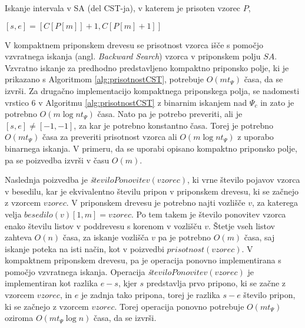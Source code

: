 \begin{algorithm}[htb]

\caption{Iskanje intervala v SA (del CST-ja), v katerem je prisoten vzorec $P$,  \cite{Navarro2016}}\label{alg:prisotnostCST}
{
    {$[s,e]=[C[P[m]]+1,C[P[m]+1]]$}
    

    {\KwRet{$[s,e]$}}
}

\end{algorithm}

V kompaktnem priponskem drevesu se prisotnost vzorca išče s pomočjo vzvratnega iskanja (angl. \textit{Backward Search}) vzorca v priponskem polju $SA$. Vzvratno iskanje za predhodno predstavljeno kompaktno priponsko polje, ki je prikazano s Algoritmom \ref{alg:prisotnostCST}, potrebuje $O(mt_\Psi)$ časa, da se izvrši. Za drugačno implementacijo kompaktnega priponskega polja, se nadomesti vrstico 6 v Algoritmu \ref{alg:prisotnostCST} z binarnim iskanjem nad $\Psi_c$ in zato je potrebno $O(m\log{n}t_\Psi)$ časa. Nato pa je potrebo preveriti, ali je $[s,e]\ne[-1,-1]$, za kar je potrebno konstantno časa. Torej je potrebno $O(mt_\Psi)$ časa za preveriti prisotnost vzorca ali $O(m\log{n}t_\Psi)$ z uporabo binarnega iskanja. V primeru, da se uporabi opisano kompaktno priponsko polje, pa se poizvedba izvrši v času $O(m)$.

Naslednja poizvedba je \textit{š}$teviloPonovitev(vzorec)$, ki vrne  število pojavov vzorca v besedilu, kar je ekvivalentno številu pripon v priponskem drevesu, ki se začnejo z vzorcem $vzorec$. V priponskem drevesu je potrebno najti vozlišče $v$, za katerega velja $besedilo(v)[1,m]=vzorec$. Po tem takem je število ponovitev vzorca enako številu listov v poddrevesu s korenom v vozlišču $v$. Štetje vseh listov zahteva $O(n)$ časa, za iskanje vozlišča $v$ pa je potrebno $O(m)$ časa, saj iskanje poteka na isti način, kot v poizvedbi  $prisotnost(vzorec)$. V kompaktnem priponskem drevesu, pa je operacija ponovno implementirana s pomočjo vzvratnega iskanja. Operacija \textit{š}$teviloPonovitev(vzorec)$ je implementiran kot razlika $e-s$, kjer $s$ predstavlja prvo pripono, ki se začne z vzorcem $vzorec$, in $e$ je zadnja tako pripona, torej je razlika $s-e$ število pripon, ki se začnejo z vzorcem $vzorec$. Torej operacija ponovno potrebuje $O(mt_\Psi)$ oziroma $O(mt_\Psi\log{n})$ časa, da se izvrši.

